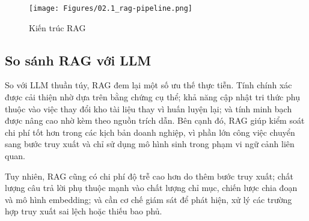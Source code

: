 \begin{figure}[H]
    \centering
    \texttt{[image: Figures/02.1\_rag-pipeline.png]}
    \caption{Kiến trúc RAG}
    \label{fig:rag}
\end{figure}

\subsection{So sánh RAG với LLM}

So với LLM thuần túy, RAG đem lại một số ưu thế thực tiễn. Tính chính xác được cải thiện nhờ dựa trên bằng chứng cụ thể; khả năng cập nhật tri thức phụ thuộc vào việc thay đổi kho tài liệu thay vì huấn luyện lại; và tính minh bạch được nâng cao nhờ kèm theo nguồn trích dẫn. Bên cạnh đó, RAG giúp kiểm soát chi phí tốt hơn trong các kịch bản doanh nghiệp, vì phần lớn công việc chuyển sang bước truy xuất và chỉ sử dụng mô hình sinh trong phạm vi ngữ cảnh liên quan.

Tuy nhiên, RAG cũng có chi phí độ trễ cao hơn do thêm bước truy xuất; chất lượng câu trả lời phụ thuộc mạnh vào chất lượng chỉ mục, chiến lược chia đoạn và mô hình embedding; và cần cơ chế giám sát để phát hiện, xử lý các trường hợp truy xuất sai lệch hoặc thiếu bao phủ.
